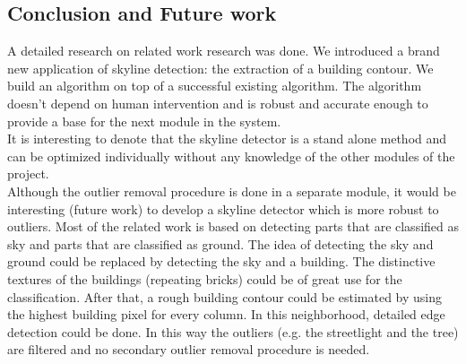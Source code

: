 \subsection{Conclusion and Future work}
A detailed research on related work research was done.
We introduced a brand new application of skyline detection: the extraction of a
building contour. We build an algorithm on top of a successful existing
algorithm.  The algorithm doesn't depend on human intervention and is robust and
accurate enough to provide a base for the next module in the system.\\
It is interesting to denote that the skyline detector is a stand alone method and
can be optimized individually without any knowledge of the other modules of the
project.\\

Although the outlier removal procedure is done in a separate module, it would be
interesting (future work) to develop a skyline detector which is more robust to
outliers.  Most of the related work is based on detecting parts that are
classified as sky and parts that are classified as ground. The idea of detecting
the sky and ground could be replaced by detecting the sky and a building. The
distinctive textures of the buildings (repeating bricks) could be of great use
for the classification.  After that, a rough building contour could be estimated
	by using the highest building pixel for every column. In this neighborhood,
	detailed edge detection could be done. In this way the outliers (e.g. the
	streetlight and the tree) are filtered and no secondary outlier removal
	procedure is needed.


